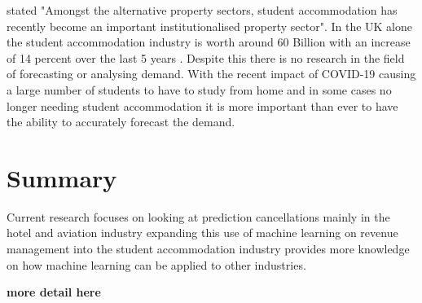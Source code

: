 \vspace{5mm}

\cite{Newell2018TheSector} stated "Amongst the alternative property sectors, student accommodation has recently become an important institutionalised property sector". In the UK alone the student accommodation industry is worth around 60 Billion \cite{UKWakefield} with an increase of 14 percent over the last 5 years \cite{UKWakefield}. Despite this there is no research in the field of forecasting or analysing demand. With the recent impact of COVID-19 causing a large number of students to have to study from home and in some cases no longer needing student accommodation it is more important than ever to have the ability to accurately forecast the demand. 


\section{Summary}

Current research focuses on looking at prediction cancellations mainly in the hotel and aviation industry expanding this use of machine learning on revenue management into the student accommodation industry provides more knowledge on how machine learning can be applied to other industries. 

\textbf{more detail here}


